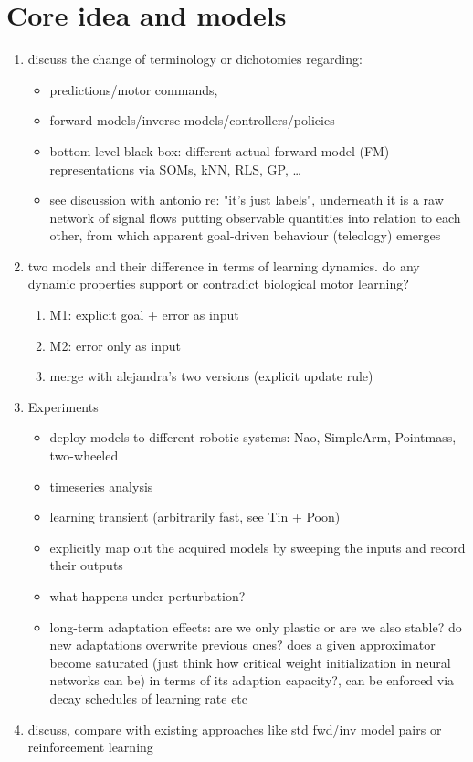 \documentclass[11pt]{llncs}
\begin{document}
\section{Core idea and models}
\label{sec:org733d6e8}
\begin{enumerate}
\item discuss the change of terminology or dichotomies regarding:
\begin{itemize}
\item predictions/motor commands,
\item forward models/inverse models/controllers/policies
\item bottom level black box: different actual forward model (FM)
representations via SOMs, kNN, RLS, GP, \ldots{}
\item see discussion with antonio re: "it's just labels", underneath it is a raw
network of signal flows putting observable quantities into
relation to each other, from which apparent goal-driven behaviour
(teleology) emerges
\end{itemize}
\item two models and their difference in terms of learning dynamics. do
any dynamic properties support or contradict biological motor learning?
\begin{enumerate}
\item M1: explicit goal + error as input
\item M2: error only as input
\item merge with alejandra's two versions (explicit update rule)
\end{enumerate}
\item Experiments
\begin{itemize}
\item deploy models to different robotic systems: Nao, SimpleArm,
Pointmass, two-wheeled
\item timeseries analysis
\item learning transient (arbitrarily fast, see Tin + Poon)
\item explicitly map out the acquired models by sweeping the inputs and
record their outputs
\item what happens under perturbation?
\item long-term adaptation effects: are we only plastic or are we also
stable? do new adaptations overwrite previous ones? does a given
approximator become saturated (just think how critical weight
initialization in neural networks can be) in terms of its adaption
capacity?, can be enforced via decay schedules of learning rate
etc
\end{itemize}
\item discuss, compare with existing approaches like std fwd/inv model
pairs or reinforcement learning
\end{enumerate}
\end{document}
